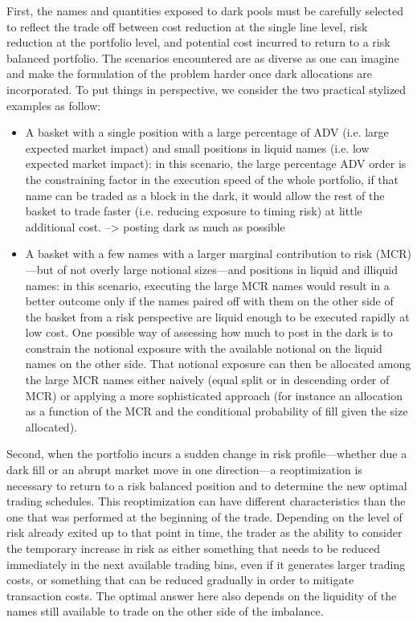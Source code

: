 First, the names and quantities exposed to dark pools must be carefully selected to reflect the trade off between cost reduction at the single line level, risk reduction at the portfolio level, and potential cost incurred to return to a risk balanced portfolio. The scenarios encountered are as diverse as one can imagine and make the formulation of the problem harder once dark allocations are incorporated. To put things in perspective, we consider the two practical stylized examples as follow:


\begin{itemize}
\item A basket with a single position with a large percentage of ADV (i.e. large expected market impact) and small positions in liquid names (i.e. low expected market impact): in this scenario, the large percentage ADV order is the constraining factor in the execution speed of the whole portfolio, if that name can be traded as a block in the dark, it would allow the rest of the basket to trade faster (i.e. reducing exposure to timing risk) at little additional cost. --> posting dark as much as possible
\item A basket with a few names with a larger marginal contribution to risk (MCR)---but of not overly large notional sizes---and positions in liquid and illiquid names: in this scenario, executing the large MCR names would result in a better outcome only if the names paired off with them on the other side of the basket from a risk perspective are liquid enough to be executed rapidly at low cost. One possible way of assessing how much to post in the dark is to constrain the notional exposure with the available notional on the liquid names on the other side. That notional exposure can then be allocated among the large MCR names either naively (equal split or in descending order of MCR) or applying a more sophisticated approach (for instance an allocation as a function of the MCR and the conditional probability of fill given the size allocated).
\end{itemize}


Second, when the portfolio incurs a sudden change in risk profile---whether due a dark fill or an abrupt market move in one direction---a reoptimization is necessary to return to a risk balanced position and to determine the new optimal trading schedules. This reoptimization can have different characteristics than the one that was performed at the beginning of the trade. Depending on the level of risk already exited up to that point in time, the trader as the ability to consider the temporary increase in risk as either something that needs to be reduced immediately in the next available trading bins, even if it generates larger trading costs, or something that can be reduced gradually in order to mitigate transaction costs. The optimal answer here also depends on the liquidity of the names still available to trade on the other side of the imbalance.



